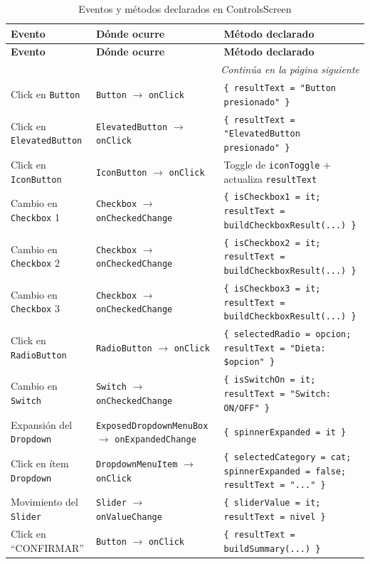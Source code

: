\documentclass[stu, 12pt, letterpaper, donotrepeattitle, floatsintext, natbib]{apa7}
\begin{document}
\begin{longtable}{@{}p{2.8cm}p{3.7cm}p{9cm}@{}}
\caption{Eventos y métodos declarados en ControlsScreen}
\label{tab:evcontrols}\\
\toprule
\textbf{Evento} & \textbf{Dónde ocurre} & \textbf{Método declarado} \\
\midrule
\endfirsthead
\toprule
\textbf{Evento} & \textbf{Dónde ocurre} & \textbf{Método declarado} \\
\midrule
\endhead
\midrule
\multicolumn{3}{r}{\small\textit{Continúa en la página siguiente}}\\
\endfoot
\bottomrule
\endlastfoot
Click en \texttt{Button} & \texttt{Button} $\rightarrow$ \texttt{onClick} & \texttt{\{ resultText = "Button presionado" \}} \\[3pt]
Click en \texttt{ElevatedButton} & \texttt{ElevatedButton} $\rightarrow$ \texttt{onClick} & \texttt{\{ resultText = "ElevatedButton presionado" \}} \\[3pt]
Click en \texttt{IconButton} & \texttt{IconButton} $\rightarrow$ \texttt{onClick} & Toggle de \texttt{iconToggle} + actualiza \texttt{resultText} \\[3pt]
Cambio en \texttt{Checkbox} 1 & \texttt{Checkbox} $\rightarrow$ \texttt{onCheckedChange} & \texttt{\{ isCheckbox1 = it; resultText = buildCheckboxResult(...) \}} \\[3pt]
Cambio en \texttt{Checkbox} 2 & \texttt{Checkbox} $\rightarrow$ \texttt{onCheckedChange} & \texttt{\{ isCheckbox2 = it; resultText = buildCheckboxResult(...) \}} \\[3pt]
Cambio en \texttt{Checkbox} 3 & \texttt{Checkbox} $\rightarrow$ \texttt{onCheckedChange} & \texttt{\{ isCheckbox3 = it; resultText = buildCheckboxResult(...) \}} \\[3pt]
Click en \texttt{RadioButton} & \texttt{RadioButton} $\rightarrow$ \texttt{onClick} & \texttt{\{ selectedRadio = opcion; resultText = "Dieta: \$opcion" \}} \\[3pt]
Cambio en \texttt{Switch} & \texttt{Switch} $\rightarrow$ \texttt{onCheckedChange} & \texttt{\{ isSwitchOn = it; resultText = "Switch: ON/OFF" \}} \\[3pt]
Expansión del \texttt{Dropdown} & \texttt{ExposedDropdownMenuBox} $\rightarrow$ \texttt{onExpandedChange} & \texttt{\{ spinnerExpanded = it \}} \\[3pt]
Click en ítem \texttt{Dropdown} & \texttt{DropdownMenuItem} $\rightarrow$ \texttt{onClick} & \texttt{\{ selectedCategory = cat; spinnerExpanded = false; resultText = "..." \}} \\[3pt]
Movimiento del \texttt{Slider} & \texttt{Slider} $\rightarrow$ \texttt{onValueChange} & \texttt{\{ sliderValue = it; resultText = nivel \}} \\[3pt]
Click en ``CONFIRMAR'' & \texttt{Button} $\rightarrow$ \texttt{onClick} & \texttt{\{ resultText = buildSummary(...) \}} \\
\end{longtable}
\end{document}
